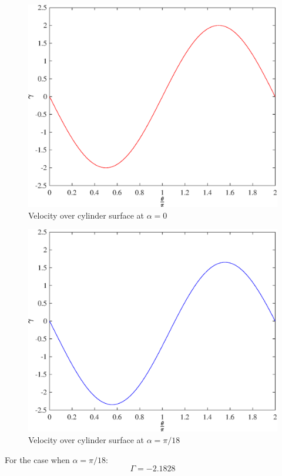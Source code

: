 


  



\begin{figure}[!h]
\centering
\includegraphics[scale=0.70]{graphs/e5g1.eps}
\caption{Velocity over cylinder surface at $\alpha = 0$}
\label{e5g1}
\end{figure}

\begin{figure}[H]
\centering
\includegraphics[scale=0.70]{graphs/e5g2.eps}
\caption{Velocity over cylinder surface at $\alpha = \pi/18$}
\label{e5g2}
\end{figure}

\justify
\vspace{4cm}
For the case when $\alpha = \pi/18$:
\[
\Gamma = -2.1828
\]

\pagebreak